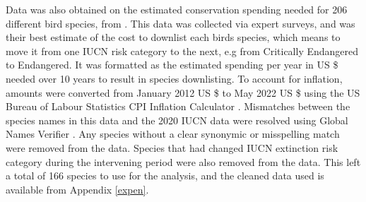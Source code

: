 \documentclass[10pt]{article}
\begin{document}
	Data was also obtained on the estimated conservation spending needed for 206 different bird species, from \citet{mccarthyFinancialCostsMeeting2012}. This data was collected via expert surveys, and was their best estimate of the cost to downlist each birds species,
	which means to move it from one IUCN risk category to the next, e.g from Critically Endangered
	to Endangered. It was formatted as the estimated spending per year in US \$ needed over 10 years to result in species downlisting. To account for inflation, amounts were converted from January 2012
	US \$ to May 2022 US \$ using the US Bureau of Labour Statistics CPI Inflation Calculator
	\citep{CPIInflationCalculator} %
	. Mismatches between the species names in this data and the 2020 IUCN data were resolved using Global Names Verifier \citep{mozzherinGnamesGnverifierV12022}. Any species without a clear synonymic or misspelling match were removed from the data. Species that had changed IUCN extinction risk category
	during the intervening period were also removed from the data. This left a total of 166 species to use for the analysis, and the cleaned data used is available from Appendix \ref{expen}.
	
\end{document}
